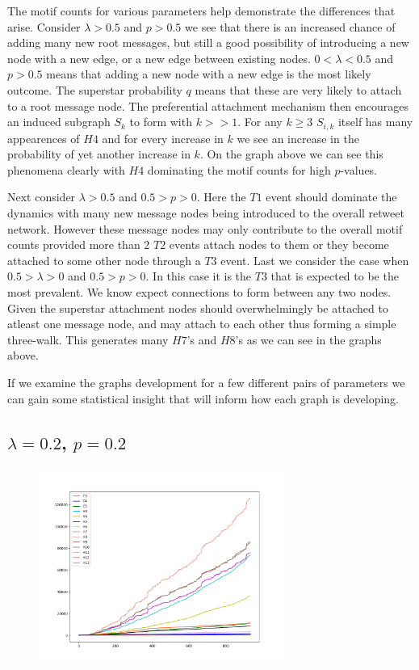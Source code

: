 \vspace{3mm}

The motif counts for various parameters help demonstrate the differences that arise. 
Consider $\lambda>0.5$ and $p>0.5$ we see that there is an increased chance of adding
many new root messages, but still a good possibility of introducing a new node with a new edge,
or a new edge between existing nodes. $0<\lambda<0.5$ and $p>0.5$ means that adding a new node
with a new edge is the most likely outcome. The superstar probability $q$ means that these
are very likely to attach to a root message node. The preferential attachment mechanism then
encourages an induced subgraph $S_{k}$ to form with $k>>1$. For any $k\geq3$ $S_{i,k}$
itself has many appearences of $H4$ and for every increase in $k$ we see an increase in the probability
of yet another increase in $k$. On the graph above we can see this phenomena clearly with $H4$
dominating the motif counts for high $p$-values.

\vspace{3mm}
Next consider $\lambda>0.5$ and $0.5>p>0$. Here the $T1$ event should dominate the dynamics 
with many new message nodes being introduced to the overall retweet network. However these
message nodes may only contribute to the overall motif counts provided more than 2 $T2$  events
attach nodes to them or they become attached to some other node through a $T3$ event.
Last we consider the case when $0.5>\lambda>0$ and $0.5>p>0$. In this case it is the $T3$ 
that is expected to be the most prevalent. We know expect connections to form between any two nodes. Given
the superstar attachment nodes should overwhelmingly be attached to atleast one message node, and may attach 
to each other thus forming a simple three-walk. This generates many $H7$'s and $H8$'s as we can
see in the graphs above.

\vspace{3mm}

If we examine the graphs development for a few different pairs of parameters we can gain some statistical insight that
will inform how each graph is developing.

\subsection*{$\lambda=0.2$, $p=0.2$}

\begin{figure}[h!]
    \includegraphics[width=8cm]{Images/twitter_sim_for_stats_3_0.2_0.2.png}
    \centering
\end{figure}

